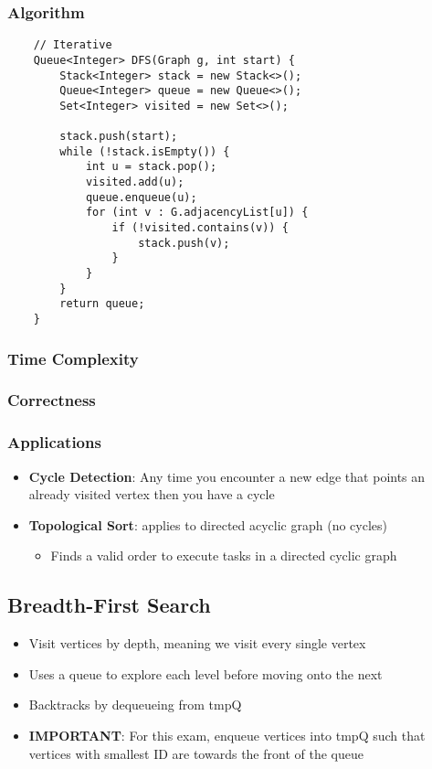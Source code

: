\documentclass[10pt, 
a4paper, 
oneside, 
headinclude, footinclude, 
BCOR5mm]
{scrartcl}
\begin{document}
\subsubsection{Algorithm}
\begin{lstlisting}
    // Iterative 
    Queue<Integer> DFS(Graph g, int start) {
        Stack<Integer> stack = new Stack<>();
        Queue<Integer> queue = new Queue<>();
        Set<Integer> visited = new Set<>();

        stack.push(start);
        while (!stack.isEmpty()) {
            int u = stack.pop();
            visited.add(u);
            queue.enqueue(u);
            for (int v : G.adjacencyList[u]) {
                if (!visited.contains(v)) {
                    stack.push(v);
                }
            }
        }
        return queue;
    }
\end{lstlisting}
\subsubsection{Time Complexity}
\subsubsection{Correctness}
\subsubsection{Applications}
\begin{itemize}
    \item \textbf{Cycle Detection}: Any time you encounter a new edge that points an already visited vertex then you have a cycle
    \item \textbf{Topological Sort}: applies to directed acyclic graph (no cycles)
    \begin{itemize}
        \item Finds a valid order to execute tasks in a directed cyclic graph
    \end{itemize}
\end{itemize}
\newpage
\subsection{Breadth-First Search}
\begin{itemize}
    \item Visit vertices by depth, meaning we visit every single vertex
    \item Uses a queue to explore each level before moving onto the next
    \item Backtracks by dequeueing from tmpQ
    \item \textbf{IMPORTANT}: For this exam, enqueue vertices into tmpQ such that vertices with smallest ID are towards the front of the queue
\end{itemize}
\end{document}
